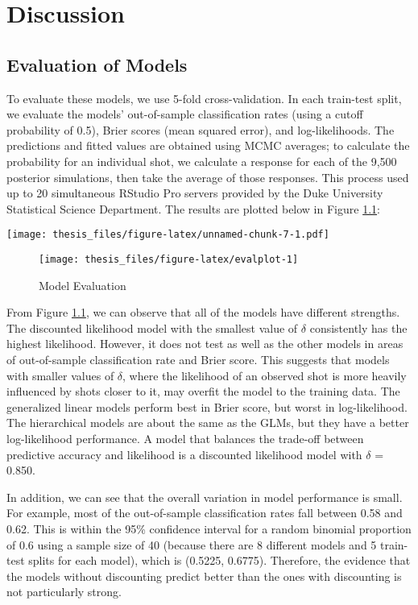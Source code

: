 \documentclass[12pt,twoside]{dukestatscithesis}
\theoremstyle{definition}
\theoremstyle{definition}
\theoremstyle{definition}
\theoremstyle{remark}
\begin{document}
\chapter{Discussion}\label{disc}

\section{Evaluation of Models}\label{evaluation-of-models}

To evaluate these models, we use 5-fold cross-validation. In each
train-test split, we evaluate the models' out-of-sample classification
rates (using a cutoff probability of 0.5), Brier scores (mean squared
error), and log-likelihoods. The predictions and fitted values are
obtained using MCMC averages; to calculate the probability for an
individual shot, we calculate a response for each of the 9,500 posterior
simulations, then take the average of those responses. This process used
up to 20 simultaneous RStudio Pro servers provided by the Duke
University Statistical Science Department. The results are plotted below
in Figure \ref{fig:evalplot}:

\texttt{[image: thesis\_files/figure-latex/unnamed-chunk-7-1.pdf]}

\pagebreak
\begin{figure}

{\centering \texttt{[image: thesis\_files/figure-latex/evalplot-1]} 

}

\caption{Model Evaluation}\label{fig:evalplot}
\end{figure}
From Figure \ref{fig:evalplot}, we can observe that all of the models
have different strengths. The discounted likelihood model with the
smallest value of \(\delta\) consistently has the highest likelihood.
However, it does not test as well as the other models in areas of
out-of-sample classification rate and Brier score. This suggests that
models with smaller values of \(\delta\), where the likelihood of an
observed shot is more heavily influenced by shots closer to it, may
overfit the model to the training data. The generalized linear models
perform best in Brier score, but worst in log-likelihood. The
hierarchical models are about the same as the GLMs, but they have a
better log-likelihood performance. A model that balances the trade-off
between predictive accuracy and likelihood is a discounted likelihood
model with \(\delta\) = 0.850.

In addition, we can see that the overall variation in model performance
is small. For example, most of the out-of-sample classification rates
fall between 0.58 and 0.62. This is within the 95\% confidence interval
for a random binomial proportion of 0.6 using a sample size of 40
(because there are 8 different models and 5 train-test splits for each
model), which is (0.5225, 0.6775). Therefore, the evidence that the
models without discounting predict better than the ones with discounting
is not particularly strong.
\end{document}
